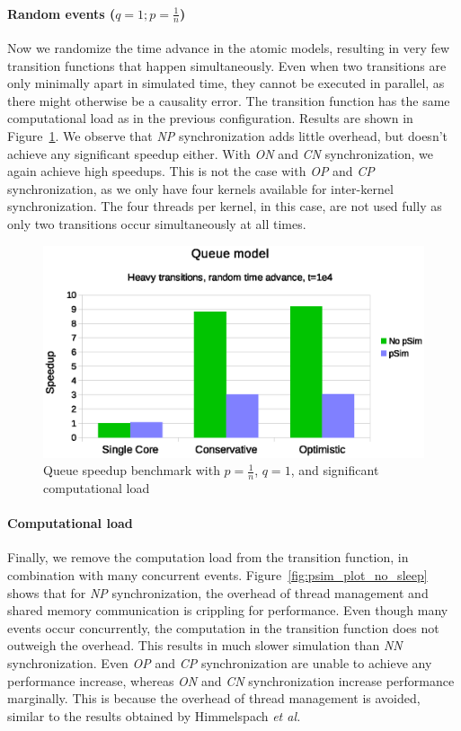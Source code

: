 \paragraph{Random events ($q = 1; p = \frac{1}{n}$)}
Now we randomize the time advance in the atomic models, resulting in very few transition functions that happen simultaneously.
Even when two transitions are only minimally apart in simulated time, they cannot be executed in parallel, as there might otherwise be a causality error.
The transition function has the same computational load as in the previous configuration. 
Results are shown in Figure~\ref{fig:psim_plot_random_sleep}.
We observe that \textit{NP} synchronization adds little overhead, but doesn't achieve any significant speedup either.
With \textit{ON} and \textit{CN} synchronization, we again achieve high speedups.
This is not the case with \textit{OP} and \textit{CP} synchronization, as we only have four kernels available for inter-kernel synchronization.
The four threads per kernel, in this case, are not used fully as only two transitions occur simultaneously at all times.

\begin{figure}
	\center
	\includegraphics[width=\columnwidth]{fig/pdevs_random_sleep.eps}
	\caption{Queue speedup benchmark with $p = \frac{1}{n}$, $q = 1$, and significant computational load}
	\label{fig:psim_plot_random_sleep}
\end{figure}

\paragraph{Computational load}
Finally, we remove the computation load from the transition function, in combination with many concurrent events.
Figure~\ref{fig:psim_plot_no_sleep} shows that for \textit{NP} synchronization, the overhead of thread management and shared memory communication is crippling for performance.
Even though many events occur concurrently, the computation in the transition function does not outweigh the overhead.
This results in much slower simulation than \textit{NN} synchronization.
Even \textit{OP} and \textit{CP} synchronization are unable to achieve any performance increase, whereas \textit{ON} and \textit{CN} synchronization increase performance marginally.
This is because the overhead of thread management is avoided, similar to the results obtained by Himmelspach \textit{et al.}~\cite{Himmelspach}
 
